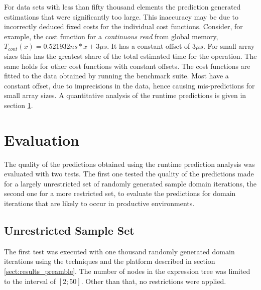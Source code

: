 For data sets with less than fifty thousand elements the prediction generated estimations that were significantly too large. This inaccuracy may be due to incorrectly deduced fixed costs for the individual cost functions. Consider, for example, the cost function for a \textit{continuous read} from global memory, $T_{cont}(x) = 0.521932ns * x + 3\mu s$. It has a constant offset of $3\mu s$. For small array sizes this has the greatest share of the total estimated time for the operation. The same holds for other cost functions with constant offsets. The cost functions are fitted to the data obtained by running the benchmark suite. Most have a constant offset, due to imprecisions in the data, hence causing mis-predictions for small array sizes. A quantitative analysis of the runtime predictions is given in section \ref{sect:results_evaluation}.

\newpage



\section{Evaluation}
\label{sect:results_evaluation}
The quality of the predictions obtained using the runtime prediction analysis was evaluated with two tests. The first one tested the quality of the predictions made for a largely unrestricted set of randomly generated sample domain iterations, the second one for a more restricted set, to evaluate the predictions for domain iterations that are likely to occur in productive environments.

\subsection{Unrestricted Sample Set}
\label{sect:results_evaluation_unrestricted}
The first test was executed with one thousand randomly generated domain iterations using the techniques and the platform described in section \ref{sect:results_preamble}. The number of nodes in the expression tree was limited to the interval of $[2;50]$. Other than that, no restrictions were applied. \\

